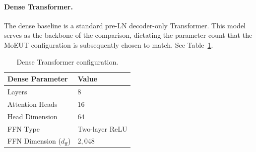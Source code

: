 \documentclass[11pt]{article}
\begin{document}
\paragraph{Dense Transformer.} 
The dense baseline is a standard pre-LN decoder-only Transformer.
This model serves as the backbone of the comparison, dictating the parameter count that the MoEUT configuration is subsequently chosen to match.
See Table~\ref{tab:dense_params}.
\begin{table}[htbp]
  \centering
  \small
  \begin{tabular}{ll}
    \toprule
    \textbf{Dense Parameter} & \textbf{Value} \\
    \midrule
    Layers & $8$ \\
    Attention Heads & $16$ \\
    Head Dimension & $64$ \\
    FFN Type & Two-layer ReLU \\
    FFN Dimension ($d_{\text{ff}}$) & $2{,}048$ \\
    \bottomrule
  \end{tabular}
  \caption{Dense Transformer configuration.}
  \label{tab:dense_params}
\end{table}
\end{document}
